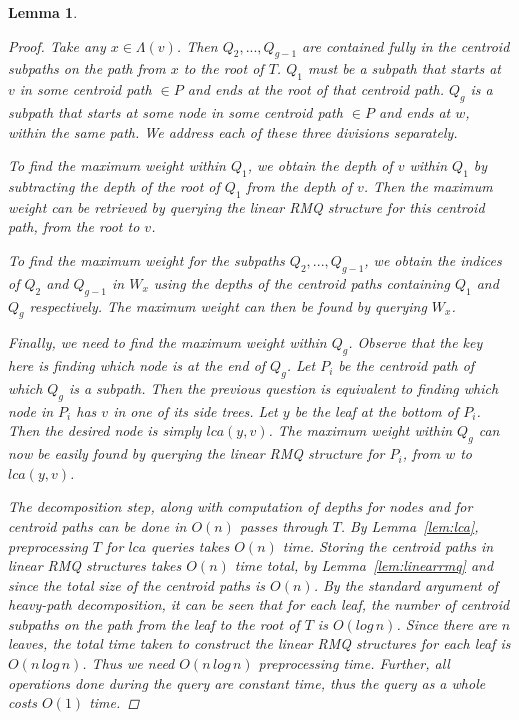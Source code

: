 \documentclass{article}
\newcommand{\leafset}{\Lambda}
\newtheorem{rmqinc}[incompatibility]{Lemma}
\begin{document}
\begin{rmqinc}
\begin{proof}
            Take any $x \in \leafset(v)$. Then $Q_2, ..., Q_{g - 1}$ are contained fully in the centroid subpaths on the path from $x$ to the root of $T$. $Q_1$ must be a subpath that starts at $v$ in some centroid path $\in P$ and ends at the root of that centroid path. $Q_g$ is a subpath that starts at some node in some centroid path $\in P$ and ends at $w$, within the same path. We address each of these three divisions separately.

            To find the maximum weight within $Q_1$, we obtain the depth of $v$ within $Q_1$ by subtracting the depth of the root of $Q_1$ from the depth of $v$. Then the maximum weight can be retrieved by querying the linear RMQ structure for this centroid path, from the root to $v$.

            To find the maximum weight for the subpaths $Q_2, ..., Q_{g - 1}$, we obtain the indices of $Q_2$ and $Q_{g-1}$ in $W_x$ using the depths of the centroid paths containing $Q_1$ and $Q_g$ respectively. The maximum weight can then be found by querying $W_x$.

            Finally, we need to find the maximum weight within $Q_g$. Observe that the key here is finding which node is at the end of $Q_g$. Let $P_i$ be the centroid path of which $Q_g$ is a subpath. Then the previous question is equivalent to finding which node in $P_i$ has $v$ in one of its side trees. Let $y$ be the leaf at the bottom of $P_i$. Then the desired node is simply $lca(y, v)$. The maximum weight within $Q_g$ can now be easily found by querying the linear RMQ structure for $P_i$, from $w$ to $lca(y, v)$.

            The decomposition step, along with computation of depths for nodes and for centroid paths can be done in $O(n)$ passes through $T$. By Lemma~\ref{lem:lca}, preprocessing $T$ for $lca$ queries takes $O(n)$ time. Storing the centroid paths in linear RMQ structures takes $O(n)$ time total, by Lemma~\ref{lem:linearrmq} and since the total size of the centroid paths is $O(n)$. By the standard argument of heavy-path decomposition, it can be seen that for each leaf, the number of centroid subpaths on the path from the leaf to the root of $T$ is $O(log\,n)$. Since there are $n$ leaves, the total time taken to construct the linear RMQ structures for each leaf is $O(n\,log\,n)$. Thus we need $O(n\,log\,n)$ preprocessing time. Further, all operations done during the query are constant time, thus the query as a whole costs $O(1)$ time.
        \end{proof}
    \end{rmqinc}
\end{document}
